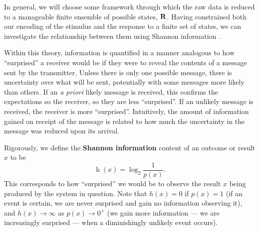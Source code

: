
In general, we will choose some framework through which the raw data is reduced to a manageable finite ensemble of possible states, $\mathbf{R}$.
Having constrained both our encoding of the stimulus and the response to a finite set of states, we can investigate the relationship between them using Shannon information \citep{Shannon1948}.

Within this theory, information is quantified in a manner analogous to how ``surprised'' a receiver would be if they were to reveal the contents of a message sent by the transmitter.
Unless there is only one possible message, there is uncertainty over what will be sent, potentially with some messages more likely than others.
If an \textit{a priori} likely message is received, this confirms the expectations so the receiver, so they are less ``surprised''.
If an unlikely message is received, the receiver is more ``surprised''.
Intuitively, the amount of information gained on receipt of the message is related to how much the uncertainty in the message was reduced upon its arrival.

Rigorously, we define the \textbf{Shannon information} content of an outcome or result $x$ to be
\begin{equation}
\label{eq:shannon-information}
\operatorname{h}( x ) = \log_2 \frac{1}{p(x)}
.\end{equation}
This corresponds to how ``surprised'' we would be to observe the result $x$ being produced by the system in question.
Note that $h(x)=0$ if $p(x)=1$ (if an event is certain, we are never surprised and gain no information observing it), and $h(x) \to \infty$ as $p(x) \to 0^+$ (we gain more information --- we are increasingly surprised --- when a diminishingly unlikely event occurs).

